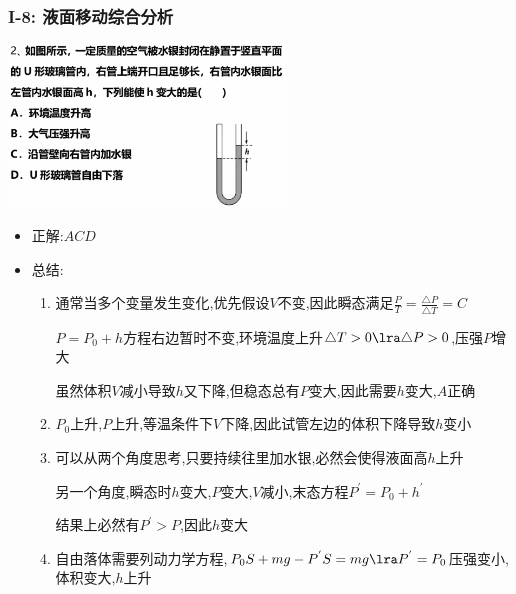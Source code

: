 \documentclass{article}
\begin{document}
\subsubsection{I-8: 液面移动综合分析 }
\includegraphics[width = 0.55\textwidth,keepaspectratio]{./pictures/2.3-9.png}

\begin{itemize}
    \item 正解:\quad $ACD$
    \item 总结:\quad

          \hspace{3em}\begin{minipage}{0.88\textwidth}
              \begin{enumerate}[label = (\Alph*)]
                  \item 通常当多个变量发生变化,优先假设$V$不变,因此瞬态满足$\frac{P}{T} = \frac{\triangle P}{\triangle T} = C$

                        $P = P_{0} + h$方程右边暂时不变,环境温度上升$\triangle T > 0 \lra \triangle P > 0$,压强$P$增大

                        虽然体积$V$减小导致$h$又下降,但稳态总有$P$变大,因此需要$h$变大,$A$正确
                  \item $P_{0}$上升,$P$上升,等温条件下$V$下降,因此试管左边的体积下降导致$h$变小
                  \item 可以从两个角度思考,只要持续往里加水银,必然会使得液面高$h$上升

                        另一个角度,瞬态时$h$变大,$P$变大,$V$减小,末态方程$P^{'} = P_{0} + h^{'}$

                        结果上必然有$P^{'}>P$,因此$h$变大
                  \item 自由落体需要列动力学方程,$P_{0}S + mg - P^{'}S = mg \lra P^{'} = P_{0}$压强变小,体积变大,$h$上升
              \end{enumerate}
          \end{minipage}
\end{itemize}

\vspace{2em}
\end{document}
